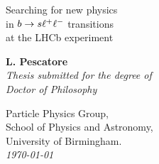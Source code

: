 \documentclass[a4paper,twoside,12pt]{report}
\newcommand{\thesistitle}{
Searching for new physics  \\
in $\bquark\to\squark\ell^+\ell^-$ transitions \\
 at the LHCb experiment
 }
\newcommand{\thesisauthor}{L. Pescatore} %
\newcommand{\thesiscrest}{crest_1}
\begin{document}
\begin{titlepage}
  \begin{center}
    \huge\sc\linespread{2} \thesistitle\\
    \end{center}
    \begin{center}
    \vspace{3.0cm}
    {\Large\bf \thesisauthor}\\
    \vspace{1.5cm}
    {\large\em Thesis submitted for the degree of}\\
    {\large\em Doctor of Philosophy}\\
    \vspace{1.5cm}
  \end{center}
  \begin{center}
  \end{center}
  \begin{flushleft}
    \hspace{7.5cm} Particle Physics Group, \\
    \hspace{7.5cm} School of Physics and Astronomy, \\
    \hspace{7.5cm} University of Birmingham. \\
    \vspace{1cm}
    \hspace{7.5cm} \emph{\today} \\
  \end{flushleft}
  \begin{center}
  \end{center}
\end{titlepage}

\thispagestyle{empty}%
~
\newpage
\thispagestyle{empty}%
~
\newpage


\pagestyle{fancy} %
\fancyfoot{} %
\fancyhead{}
\fancyhead[RE]{\sf \slshape \rightmark \hspace{5mm} \thepage }
\fancyhead[LO]{\sf \thepage \hspace{5mm} \slshape \leftmark }

\setcounter{tocdepth}{3}
\setcounter{secnumdepth}{3}
\renewcommand\tocloftpagestyle{fancy}
\renewcommand\cftchapfont{\large\sf}
\renewcommand\cftsecfont{\normalsize \sf}
\renewcommand\cftsubsecfont{\small\sf}
\renewcommand\cftsubsubsecfont{\footnotesize \sf}
%
\renewcommand\cftchappagefont{\bfseries\sffamily}
\renewcommand\cftsecpagefont{\bfseries\sffamily}
\renewcommand\cftsubsecpagefont{\bfseries\sffamily}
\renewcommand\cftsubsubsecpagefont{\bfseries\sffamily}
%
\renewcommand\cftloftitlefont{\Huge\sf}
\renewcommand\cftlottitlefont{\Huge\sf}
\renewcommand\cfttoctitlefont{\Huge\sf}
\end{document}
